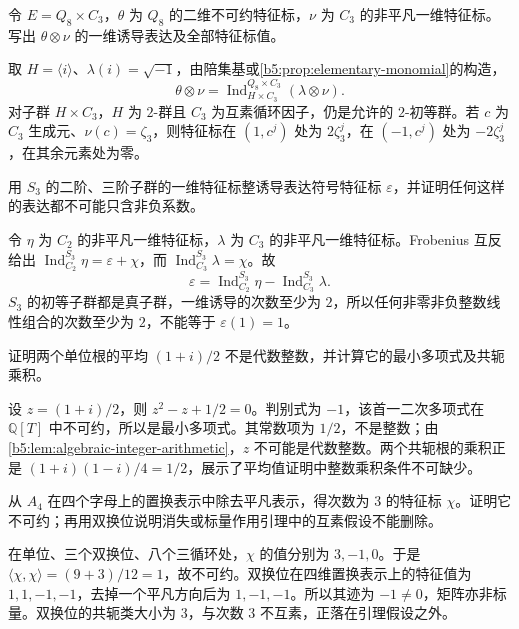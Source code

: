 \begin{exercise}\label{b5:ex:05-product-monomial}
	令 \(E=Q_8\times C_3\)，\(\theta\) 为 \(Q_8\) 的二维不可约特征标，\(\nu\) 为 \(C_3\) 的非平凡一维特征标。写出 \(\theta\otimes\nu\) 的一维诱导表达及全部特征标值。
\end{exercise}
\begin{solution}
	取 \(H=\langle i\rangle\)、\(\lambda(i)=\sqrt{-1}\)，由陪集基或\cref{b5:prop:elementary-monomial}的构造，
	\[
		\theta\otimes\nu =\operatorname{Ind}_{H\times C_3}^{Q_8\times C_3}(\lambda\otimes\nu).
	\]
	对子群 \(H\times C_3\)，\(H\) 为 \(2\)-群且 \(C_3\) 为互素循环因子，仍是允许的 \(2\)-初等群。若 \(c\) 为 \(C_3\) 生成元、\(\nu(c)=\zeta_3\)，则特征标在 \((1,c^j)\) 处为 \(2\zeta_3^j\)，在 \((-1,c^j)\) 处为 \(-2\zeta_3^j\)，在其余元素处为零。
\end{solution}

\begin{exercise}\label{b5:ex:05-sign-negative-induction}
	用 \(S_3\) 的二阶、三阶子群的一维特征标整诱导表达符号特征标 \(\varepsilon\)，并证明任何这样的表达都不可能只含非负系数。
\end{exercise}
\begin{solution}
	令 \(\eta\) 为 \(C_2\) 的非平凡一维特征标，\(\lambda\) 为 \(C_3\) 的非平凡一维特征标。Frobenius 互反给出 \(\operatorname{Ind}_{C_2}^{S_3}\eta=\varepsilon+\chi\)，而 \(\operatorname{Ind}_{C_3}^{S_3}\lambda=\chi\)。故
	\[
		\varepsilon=\operatorname{Ind}_{C_2}^{S_3}\eta -\operatorname{Ind}_{C_3}^{S_3}\lambda.
	\]
	\(S_3\) 的初等子群都是真子群，一维诱导的次数至少为 \(2\)，所以任何非零非负整数线性组合的次数至少为 \(2\)，不能等于 \(\varepsilon(1)=1\)。
\end{solution}

\begin{exercise}\label{b5:ex:05-nonintegral-average}
	证明两个单位根的平均 \((1+i)/2\) 不是代数整数，并计算它的最小多项式及共轭乘积。
\end{exercise}
\begin{solution}
	设 \(z=(1+i)/2\)，则 \(z^2-z+1/2=0\)。判别式为 \(-1\)，该首一二次多项式在 \(\mathbb Q[T]\) 中不可约，所以是最小多项式。其常数项为 \(1/2\)，不是整数；由\cref{b5:lem:algebraic-integer-arithmetic}，\(z\) 不可能是代数整数。两个共轭根的乘积正是 \((1+i)(1-i)/4=1/2\)，展示了平均值证明中整数乘积条件不可缺少。
\end{solution}

\begin{exercise}\label{b5:ex:05-a4-coprime-failure}
	从 \(A_4\) 在四个字母上的置换表示中除去平凡表示，得次数为 \(3\) 的特征标 \(\chi\)。证明它不可约；再用双换位说明消失或标量作用引理中的互素假设不能删除。
\end{exercise}
\begin{solution}
	在单位、三个双换位、八个三循环处，\(\chi\) 的值分别为 \(3,-1,0\)。于是 \(\langle\chi,\chi\rangle=(9+3)/12=1\)，故不可约。双换位在四维置换表示上的特征值为 \(1,1,-1,-1\)，去掉一个平凡方向后为 \(1,-1,-1\)。所以其迹为 \(-1\ne0\)，矩阵亦非标量。双换位的共轭类大小为 \(3\)，与次数 \(3\) 不互素，正落在引理假设之外。
\end{solution}

